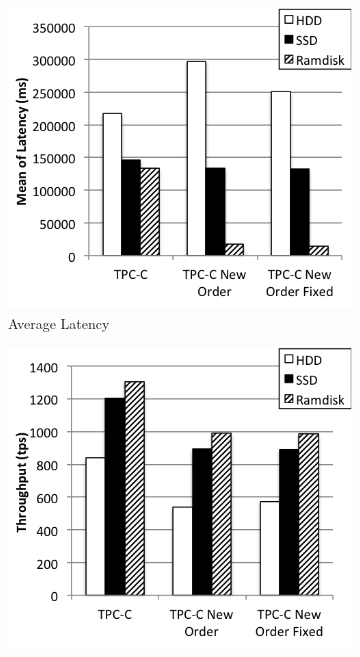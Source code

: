 \begin{figure}
    \centering
    \begin{subfigure}[t]{0.24\textwidth}
        \includegraphics[width=\textwidth]{plots/storage/latency}
        \caption{Average Latency}
        \label{fig:storage-mean}
    \end{subfigure}
    \begin{subfigure}[t]{0.24\textwidth}
        \includegraphics[width=\textwidth]{plots/storage/throughput}

\end{subfigure}
\end{figure}
